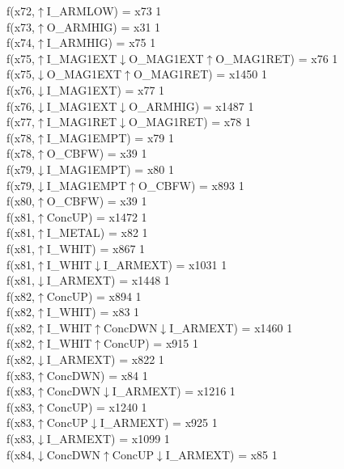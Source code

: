 f(x72,$\uparrow$I\_ARMLOW) = x73 {1} \\
f(x73,$\uparrow$O\_ARMHIG) = x31 {1} \\
f(x74,$\uparrow$I\_ARMHIG) = x75 {1} \\
f(x75,$\uparrow$I\_MAG1EXT$\downarrow$O\_MAG1EXT$\uparrow$O\_MAG1RET) = x76 {1} \\
f(x75,$\downarrow$O\_MAG1EXT$\uparrow$O\_MAG1RET) = x1450 {1} \\
f(x76,$\downarrow$I\_MAG1EXT) = x77 {1} \\
f(x76,$\downarrow$I\_MAG1EXT$\downarrow$O\_ARMHIG) = x1487 {1} \\
f(x77,$\uparrow$I\_MAG1RET$\downarrow$O\_MAG1RET) = x78 {1} \\
f(x78,$\uparrow$I\_MAG1EMPT) = x79 {1} \\
f(x78,$\uparrow$O\_CBFW) = x39 {1} \\
f(x79,$\downarrow$I\_MAG1EMPT) = x80 {1} \\
f(x79,$\downarrow$I\_MAG1EMPT$\uparrow$O\_CBFW) = x893 {1} \\
f(x80,$\uparrow$O\_CBFW) = x39 {1} \\
f(x81,$\uparrow$ConcUP) = x1472 {1} \\
f(x81,$\uparrow$I\_METAL) = x82 {1} \\
f(x81,$\uparrow$I\_WHIT) = x867 {1} \\
f(x81,$\uparrow$I\_WHIT$\downarrow$I\_ARMEXT) = x1031 {1} \\
f(x81,$\downarrow$I\_ARMEXT) = x1448 {1} \\
f(x82,$\uparrow$ConcUP) = x894 {1} \\
f(x82,$\uparrow$I\_WHIT) = x83 {1} \\
f(x82,$\uparrow$I\_WHIT$\uparrow$ConcDWN$\downarrow$I\_ARMEXT) = x1460 {1} \\
f(x82,$\uparrow$I\_WHIT$\uparrow$ConcUP) = x915 {1} \\
f(x82,$\downarrow$I\_ARMEXT) = x822 {1} \\
f(x83,$\uparrow$ConcDWN) = x84 {1} \\
f(x83,$\uparrow$ConcDWN$\downarrow$I\_ARMEXT) = x1216 {1} \\
f(x83,$\uparrow$ConcUP) = x1240 {1} \\
f(x83,$\uparrow$ConcUP$\downarrow$I\_ARMEXT) = x925 {1} \\
f(x83,$\downarrow$I\_ARMEXT) = x1099 {1} \\
f(x84,$\downarrow$ConcDWN$\uparrow$ConcUP$\downarrow$I\_ARMEXT) = x85 {1} \\
